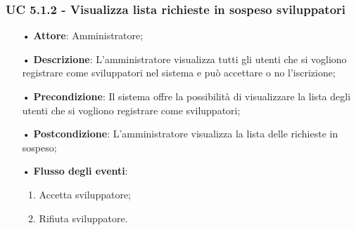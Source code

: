 \subsubsection{UC 5.1.2 - Visualizza lista richieste in sospeso sviluppatori}
\begin{itemize}

\item[•] \textbf{Attore}: Amministratore;
\item[•] \textbf{Descrizione}: L'amministratore visualizza tutti gli utenti che si vogliono registrare come sviluppatori nel sistema e può accettare o no l'iscrizione;
\item[•] \textbf{Precondizione}: Il sistema offre la possibilità di visualizzare la lista degli utenti che si vogliono registrare come sviluppatori;
\item[•] \textbf{Postcondizione}: L'amministratore visualizza la lista delle richieste in sospeso;
\item[•] \textbf{Flusso degli eventi}:
\begin{enumerate}
\item Accetta sviluppatore;
\item Rifiuta sviluppatore.
\end{enumerate}

\end{itemize}
%
%
%

